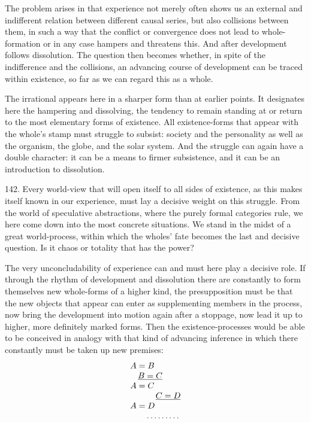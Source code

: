\documentclass[12pt,a4paper]{book}
\newcommand{\opage}[1]{\marginnote{\footnotesize\textit{[#1]}}}
\begin{document}
The problem arises in that experience not merely often shows us an external and indifferent relation
between different causal series, but also collisions between them, in such a way that the conflict or
convergence does not lead to whole-formation or in any case hampers and threatens this. And after
development follows dissolution. The question then becomes whether, in spite of the indifference and the
collisions, an advancing course of development \opage{340}can be traced within existence, so far as we can regard
this as a whole.

The irrational appears here in a sharper form than at earlier points. It designates here the hampering
and dissolving, the tendency to remain standing at or return to the most elementary forms of existence.
All existence-forms that appear with the whole's stamp must struggle to subsist: society and the
personality as well as the organism, the globe, and the solar system. And the struggle can again have a
double character: it can be a means to firmer subsistence, and it can be an introduction to dissolution.

142. Every world-view that will open itself to all sides of existence, as this makes itself known in our
experience, must lay a decisive weight on this struggle. From the world of speculative abstractions,
where the purely formal categories rule, we here come down into the most concrete situations. We stand in the
midst of a great world-process, within which the wholes' fate becomes the last and decisive question.
Is it chaos or totality that has the power?

The very unconcludability of experience can and must here play a decisive role. If through the rhythm of
development and dissolution there are constantly to form themselves new whole-forms of a higher kind, the
presupposition must be that the new objects that appear can enter as supplementing members in the process,
now bring the development into motion again after a stoppage, now lead it up to higher, more definitely
marked forms. Then the existence-processes would be able to be conceived in analogy with that kind of
advancing inference in which there constantly must be taken up new premises:
\[
\begin{array}{l}
A = B\\
\hphantom{A}\,\underline{B = C}\\
A = C\\
\hphantom{A = C}\,\underline{C = D}\\
A = D\\
\hphantom{A = }\ldots\ldots\ldots
\end{array}
\]
\end{document}
